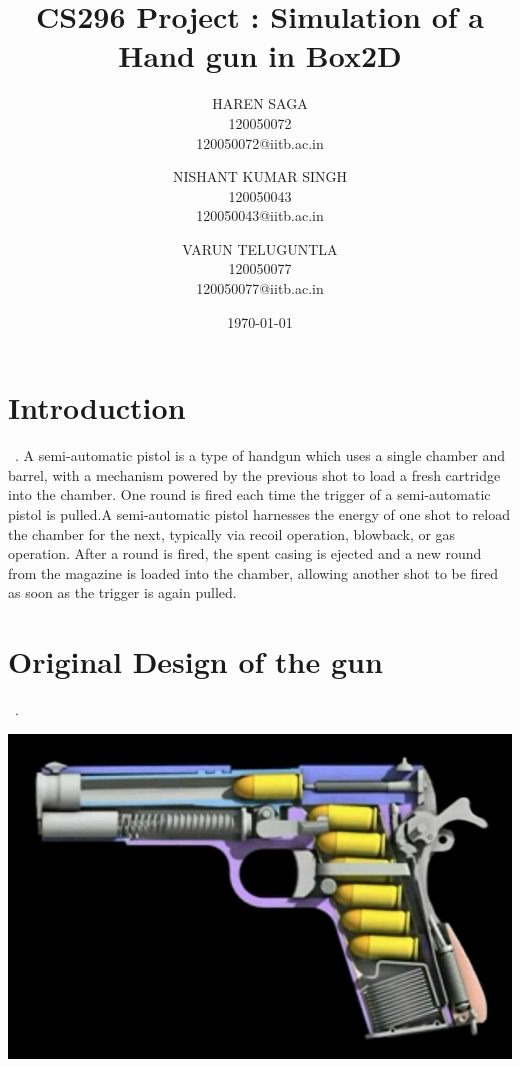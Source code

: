 \documentclass [11pt]{report}
\begin{document}
\title{CS296 Project : Simulation of a Hand gun in Box2D}
\author{
    HAREN SAGA\\
    120050072\\
    120050072@iitb.ac.in
      \and
    NISHANT KUMAR SINGH\\  
    120050043\\
    120050043@iitb.ac.in
    \and
    VARUN TELUGUNTLA\\
    120050077\\
   120050077@iitb.ac.in
}

\date{\today}

\maketitle

\section{Introduction}
~\cite{sahg}.
A semi-automatic pistol is a type of handgun which uses a single chamber and barrel, with a mechanism powered by the previous shot to load a fresh cartridge into the chamber. One round is fired each time the trigger of a semi-automatic pistol is pulled.A semi-automatic pistol harnesses the energy of one shot to reload the chamber for the next, typically via recoil operation, blowback, or gas operation. After a round is fired, the spent casing is ejected and a new round from the magazine is loaded into the chamber, allowing another shot to be fired as soon as the trigger is again pulled. 


\section{Original Design of the gun}
~\cite{utubesource}.
\begin{center}
\includegraphics[scale=0.45]{./images/actgun.png}
\end{center}
\end{document}
